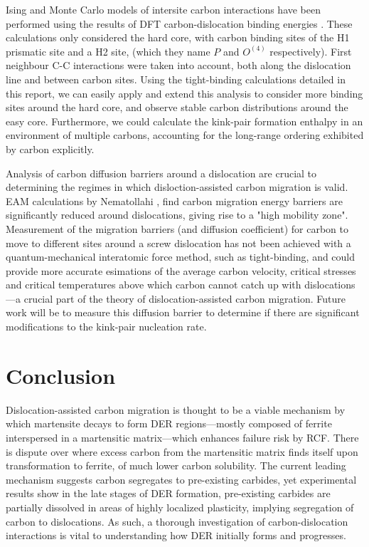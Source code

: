 \documentclass[a4paper,11pt]{article}
\begin{document}
Ising and Monte Carlo models of intersite carbon interactions have been performed using the
results of DFT carbon-dislocation binding energies \cite{Lthi2019}. These calculations only
considered the hard core, with carbon binding sites of the H1 prismatic site and a H2 site, (which
they name \(P\) and \(O^{(4)}\) respectively). First neighbour C-C interactions were taken
into account, both along the dislocation line and between carbon sites. Using the tight-binding
calculations detailed in this report, we can easily apply and extend this analysis to consider more
binding sites around the hard core, and observe stable carbon distributions around the
easy core. Furthermore, we could calculate the kink-pair formation enthalpy in an
environment of multiple carbons, accounting for the long-range ordering exhibited by
carbon explicitly.


Analysis of carbon diffusion barriers around a dislocation are crucial to determining
the regimes in which disloction-assisted carbon migration is valid. EAM calculations by
Nematollahi \cite{Nematollahi2016}, find carbon migration energy barriers are
significantly reduced around dislocations, giving rise to a "high mobility zone".
Measurement of the migration barriers (and diffusion coefficient) for carbon to move to
different sites around a screw dislocation has not been achieved with a
quantum-mechanical interatomic force method, such as tight-binding, and could provide more accurate
esimations of the average carbon velocity, critical stresses and critical temperatures
above which carbon cannot catch up with dislocations---a crucial part of the theory of
dislocation-assisted carbon migration. Future work will be to measure this diffusion
barrier to determine if there are significant modifications to the kink-pair nucleation
rate.

\section{Conclusion}
\label{sec:org7b6486f}

Dislocation-assisted carbon migration is thought to be a viable mechanism by which martensite
decays to form DER regions---mostly composed of ferrite interspersed in a martensitic
matrix---which enhances failure risk by RCF. There is dispute over where excess carbon from the
martensitic matrix finds itself upon transformation to ferrite, of much lower carbon
solubility. The current leading mechanism suggests carbon segregates to pre-existing carbides, yet
experimental results show in the late stages of DER formation, pre-existing carbides are partially
dissolved in areas of highly localized plasticity, implying segregation of carbon to
dislocations. As such, a thorough investigation of carbon-dislocation interactions is vital to
understanding how DER initially forms and progresses.
\end{document}
